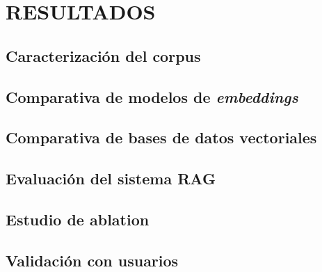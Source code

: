 \chapter{RESULTADOS}


\section{Caracterización del corpus}

\section{Comparativa de modelos de \textit{embeddings}}

\section{Comparativa de bases de datos vectoriales}

\section{Evaluación del sistema RAG}

\section{Estudio de ablation}

\section{Validación con usuarios}
